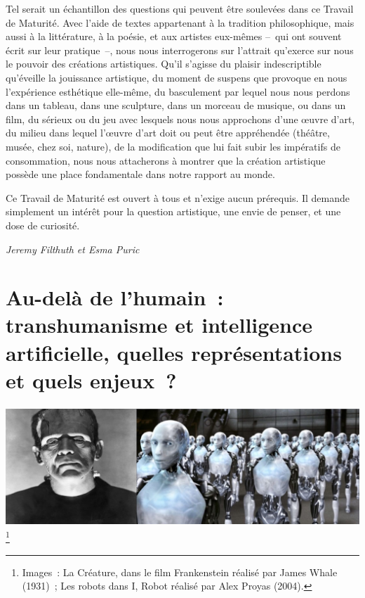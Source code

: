 \documentclass[
  10pt,
  french,
  a5paper,
  openany]{book}
\newenvironment{signature}{\begin{flushright}}{\end{flushright}}
\begin{document}
Tel serait un échantillon des questions qui peuvent être soulevées dans ce Travail de Maturité. Avec l'aide de textes appartenant à la tradition philosophique, mais aussi à la littérature, à la poésie, et aux artistes eux-mêmes --~qui ont souvent écrit sur leur pratique~--, nous nous interrogerons sur l'attrait qu'exerce sur nous le pouvoir des créations artistiques. Qu'il s'agisse du plaisir indescriptible qu'éveille la jouissance artistique, du moment de suspens que provoque en nous l'expérience esthétique elle-même, du basculement par lequel nous nous perdons dans un tableau, dans une sculpture, dans un morceau de musique, ou dans un film, du sérieux ou du jeu avec lesquels nous nous approchons d'une œuvre d'art, du milieu dans lequel l'œuvre d'art doit ou peut être appréhendée (théâtre, musée, chez soi, nature), de la modification que lui fait subir les impératifs de consommation, nous nous attacherons à montrer que la création artistique possède une place fondamentale dans notre rapport au monde.

Ce Travail de Maturité est ouvert à tous et n'exige aucun prérequis. Il demande simplement un intérêt pour la question artistique, une envie de penser, et une dose de curiosité.

\begin{signature}
\emph{Jeremy Filthuth et Esma Puric}

\end{signature}

\hypertarget{au-deluxe0-de-lhumain-transhumanisme-et-intelligence-artificielle-quelles-repruxe9sentations-et-quels-enjeux}{%
\chapter{\texorpdfstring{Au-delà de l'humain~: \linebreak transhumanisme et intelligence artificielle, quelles représentations et quels enjeux~?}{Au-delà de l'humain~: transhumanisme et intelligence artificielle, quelles représentations et quels enjeux~?}}\label{au-deluxe0-de-lhumain-transhumanisme-et-intelligence-artificielle-quelles-repruxe9sentations-et-quels-enjeux}}

\begin{center}
\includegraphics[width=\textwidth,height=12em]{images/au-dela-de-lhumain.jpg}\\
\footnote{Images~: La Créature, dans le film Frankenstein réalisé par James Whale (1931)~; Les robots dans I, Robot réalisé par Alex Proyas (2004).}

\end{center}
\end{document}
